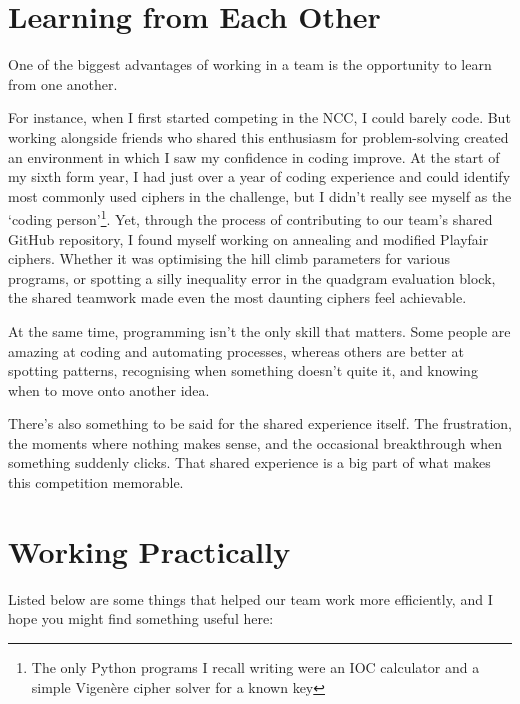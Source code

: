 \section{Learning from Each Other}

One of the biggest advantages of working in a team is the opportunity to learn from one another. 

For instance, when I first started competing in the NCC, I could barely code. But working alongside friends who shared this enthusiasm for problem-solving created an environment in which I saw my confidence in coding improve. At the start of my sixth form year, I had just over a year of coding experience and could identify most commonly used ciphers in the challenge, but I didn't really see myself as the `coding person'\footnote{The only Python programs I recall writing were an IOC calculator and a simple Vigenère cipher solver for a known key}. Yet, through the process of contributing to our team's shared GitHub repository, I found myself working on annealing and modified Playfair ciphers. Whether it was optimising the hill climb parameters for various programs, or spotting a silly inequality error in the quadgram evaluation block, the shared teamwork made even the most daunting ciphers feel achievable.

At the same time, programming isn't the only skill that matters. Some people are amazing at coding and automating processes, whereas others are better at spotting patterns, recognising when something doesn't quite it, and knowing when to move onto another idea. 

There's also something to be said for the shared experience itself. The frustration, the moments where nothing makes sense, and the occasional breakthrough when something suddenly clicks. That shared experience is a big part of what makes this competition memorable.  

\section{Working Practically}

Listed below are some things that helped our team work more efficiently, and I hope you might find something useful here: 

